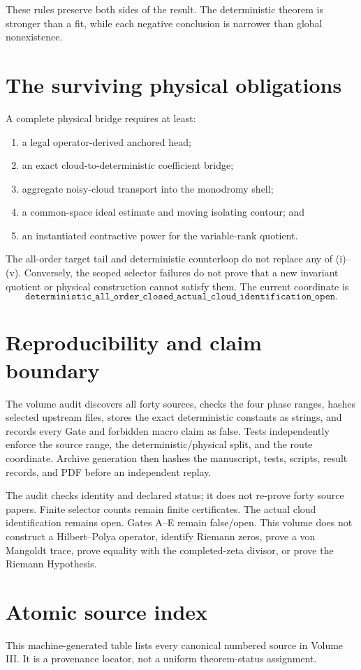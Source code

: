 \documentclass[11pt]{article}
\theoremstyle{definition}
\theoremstyle{remark}
\begin{document}
These rules preserve both sides of the result.  The deterministic theorem is
stronger than a fit, while each negative conclusion is narrower than global
nonexistence.

\section{The surviving physical obligations}

A complete physical bridge requires at least:
\begin{enumerate}[label=(\roman*),leftmargin=2.2em]
\item a legal operator-derived anchored head;
\item an exact cloud-to-deterministic coefficient bridge;
\item aggregate noisy-cloud transport into the monodromy shell;
\item a common-space ideal estimate and moving isolating contour; and
\item an instantiated contractive power for the variable-rank quotient.
\end{enumerate}

The all-order target tail and deterministic counterloop do not replace any
of (i)--(v).  Conversely, the scoped selector failures do not prove that a
new invariant quotient or physical construction cannot satisfy them.  The
current coordinate is
\[
 \boxed{\texttt{deterministic\_all\_order\_closed\_actual\_cloud\_identification\_open}}.
\]

\section{Reproducibility and claim boundary}

The volume audit discovers all forty sources, checks the four phase ranges,
hashes selected upstream files, stores the exact deterministic constants as
strings, and records every Gate and forbidden macro claim as false.  Tests
independently enforce the source range, the deterministic/physical split,
and the route coordinate.  Archive generation then hashes the manuscript,
tests, scripts, result records, and PDF before an independent replay.

The audit checks identity and declared status; it does not re-prove forty
source papers.  Finite selector counts remain finite certificates.  The
actual cloud identification remains open.  Gates A--E remain false/open.
This volume does not construct a Hilbert--Polya operator, identify Riemann
zeros, prove a von Mangoldt trace, prove equality with the completed-zeta
divisor, or prove the Riemann Hypothesis.

\appendix
\section{Atomic source index}

This machine-generated table lists every canonical numbered source in Volume
III.  It is a provenance locator, not a uniform theorem-status assignment.


\end{document}
